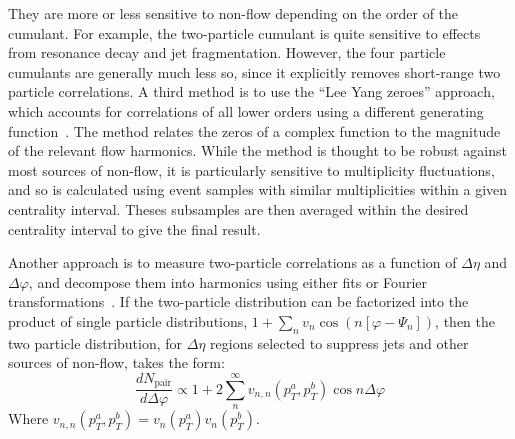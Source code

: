 They are more or less sensitive to non-flow depending on the order of the cumulant.  For example, the two-particle
cumulant is quite sensitive to effects from resonance decay and jet fragmentation.  However, the four particle
cumulants are generally much less so, since it explicitly removes short-range two particle correlations.
%
A third method is to use the ``Lee Yang zeroes'' approach, which accounts for correlations of all lower orders using a
different generating function~\cite{Bhalerao:2003yq,Borghini:2004ke}.  
The method relates the zeros of a complex function to the magnitude of the relevant
flow harmonics.  While the method is thought to be robust against most sources of non-flow, it is particularly sensitive to
multiplicity fluctuations, and so is calculated using event samples with similar multiplicities within a given
centrality interval.  Theses subsamples are then averaged within the desired centrality interval to give the final result.

Another approach is to measure two-particle correlations as a function of $\Delta\eta$ and $\Delta\varphi$, and
decompose them into harmonics using either fits or Fourier transformations~\cite{ATLAS:2012at,Aamodt:2011by,ALICE:2011ab}.
If the two-particle distribution can be factorized into the product of single particle distributions, $1+\sum_n v_n \cos(n[\varphi-\Psi_n])$, then
the two particle distribution, for $\Delta\eta$ regions selected to suppress jets and other sources of non-flow, takes the form:
\begin{equation}
\frac{dN_{\mathrm{pair}}}{d\Delta\varphi} \propto 1 + 2 \sum_n^{\infty} v_{n,n}(p_T^a,p_T^b) \cos n\Delta\varphi
\end{equation}
Where $v_{n,n}(p_T^a,p_T^b) = v_n(p_T^a) v_n(p_T^b)$.

